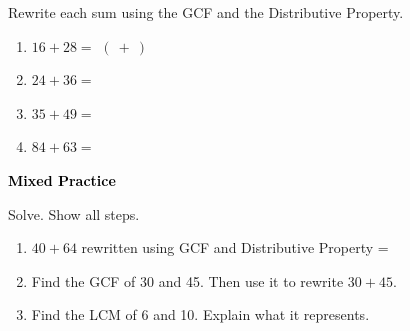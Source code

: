 \documentclass[12pt, letterpaper, fleqn]{article}
\newcommand{\blank}{\underline{\hspace{2.2cm}}}
\begin{document}
\noindent
Rewrite each sum using the GCF and the Distributive Property.

\vspace{3mm}
\begin{enumerate}[itemsep=2.2cm, leftmargin=0.6cm]
\item $16 + 28 = $ \blank$(\ + \ )$

\vspace{2cm}

\item $24 + 36 = $ \blank

\vspace{2cm}

\item $35 + 49 = $ \blank

\vspace{2cm}

\item $84 + 63 = $ \blank

\vspace{2cm}

\end{enumerate}

\newpage

\begin{tcolorbox}[colback=black!10]
\large\textcolor{black}{\textbf{Mixed Practice}}
\end{tcolorbox}

\noindent
Solve. Show all steps.

\vspace{3mm}
\begin{enumerate}[itemsep=2.3cm, leftmargin=0.6cm]
\item $40 + 64$ rewritten using GCF and Distributive Property = \blank

\vspace{2.2cm}

\item Find the GCF of 30 and 45. Then use it to rewrite $30 + 45$.

\vspace{2.2cm}

\item Find the LCM of 6 and 10. Explain what it represents.

\vspace{2.2cm}

\end{enumerate}
\end{document}

